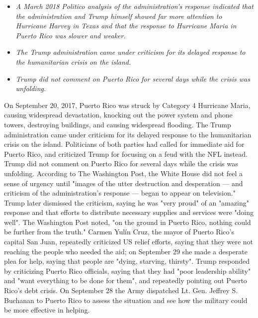 \begin{itemize}
\item
  \emph{A March 2018 Politico analysis of the administration's response
  indicated that the administration and Trump himself showed far more
  attention to Hurricane Harvey in Texas and that the response to
  Hurricane Maria in Puerto Rico was slower and weaker.}
\item
  \emph{The Trump administration came under criticism for its delayed
  response to the humanitarian crisis on the island.}
\item
  \emph{Trump did not comment on Puerto Rico for several days while the
  crisis was unfolding.}
\end{itemize}

On September 20, 2017, Puerto Rico was struck by Category 4 Hurricane
Maria, causing widespread devastation, knocking out the power system and
phone towers, destroying buildings, and causing widespread flooding. The
Trump administration came under criticism for its delayed response to
the humanitarian crisis on the island. Politicians of both parties had
called for immediate aid for Puerto Rico, and criticized Trump for
focusing on a feud with the NFL instead. Trump did not comment on Puerto
Rico for several days while the crisis was unfolding. According to The
Washington Post, the White House did not feel a sense of urgency until
"images of the utter destruction and desperation --- and criticism of
the administration's response --- began to appear on television." Trump
later dismissed the criticism, saying he was "very proud" of an
"amazing" response and that efforts to distribute necessary supplies and
services were "doing well". The Washington Post noted, "on the ground in
Puerto Rico, nothing could be further from the truth." Carmen Yulín
Cruz, the mayor of Puerto Rico's capital San Juan, repeatedly criticized
US relief efforts, saying that they were not reaching the people who
needed the aid; on September 29 she made a desperate plea for help,
saying that people are "dying, starving, thirsty". Trump responded by
criticizing Puerto Rico officials, saying that they had "poor leadership
ability" and "want everything to be done for them", and repeatedly
pointing out Puerto Rico's debt crisis. On September 28 the Army
dispatched Lt. Gen. Jeffrey S. Buchanan to Puerto Rico to assess the
situation and see how the military could be more effective in helping.


